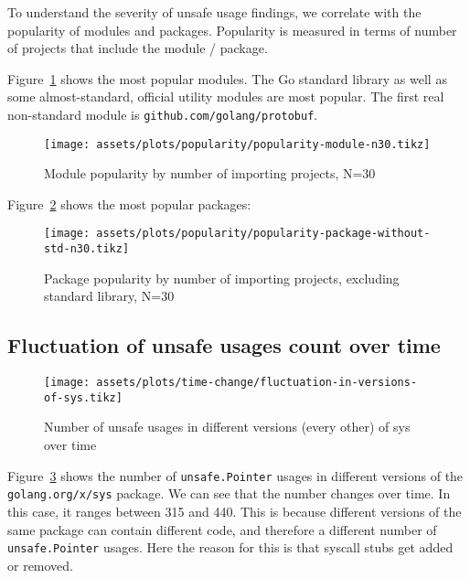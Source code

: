 To understand the severity of unsafe usage findings, we correlate with the popularity of modules and packages.
Popularity is measured in terms of number of projects that include the module / package.

Figure~\ref{fig:popularity-module} shows the most popular modules.
The Go standard library as well as some almost-standard, official utility modules are most popular.
The first real non-standard module is \texttt{github.com/golang/protobuf}.

\begin{figure}[ht]
    \centering
    {\scriptsize \texttt{[image: assets/plots/popularity/popularity-module-n30.tikz]}}
    \caption{Module popularity by number of importing projects, N=30}
    \label{fig:popularity-module}
\end{figure}

Figure~\ref{fig:popularity-package} shows the most popular packages:

\begin{figure}[ht]
    \centering
    {\scriptsize \texttt{[image: assets/plots/popularity/popularity-package-without-std-n30.tikz]}}
    \caption{Package popularity by number of importing projects, excluding standard library, N=30}
    \label{fig:popularity-package}
\end{figure}



\subsection{Fluctuation of unsafe usages count over time}\label{subsec:results-time-change}

\begin{figure}[ht]
    \centering
    {\scriptsize \texttt{[image: assets/plots/time-change/fluctuation-in-versions-of-sys.tikz]}}
    \caption{Number of unsafe usages in different versions (every other) of sys over time}
    \label{fig:fluctuation-in-versions-of-sys}
\end{figure}

Figure~\ref{fig:fluctuation-in-versions-of-sys} shows the number of \texttt{unsafe.Pointer} usages in different versions
of the \texttt{golang.org/x/sys} package.
We can see that the number changes over time.
In this case, it ranges between 315 and 440.
This is because different versions of the same package can contain different code, and therefore a different number of
\texttt{unsafe.Pointer} usages.
Here the reason for this is that syscall stubs get added or removed.

